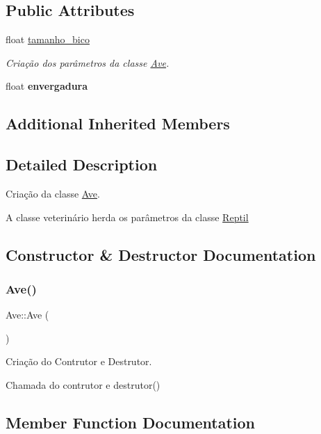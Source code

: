\subsection*{Public Attributes}
\begin{DoxyCompactItemize}
\item 
float \mbox{\hyperlink{class_ave_a0285e182b8a55a290b10b621ed93602d}{tamanho\+\_\+bico}}
\begin{DoxyCompactList}\small\item\em Criação dos parâmetros da classe \mbox{\hyperlink{class_ave}{Ave}}. \end{DoxyCompactList}\item 
\mbox{\label{class_ave_a6736c6a2391314daeb88e3e063c63ac0}} 
float {\bfseries envergadura}
\end{DoxyCompactItemize}
\subsection*{Additional Inherited Members}


\subsection{Detailed Description}
Criação da classe \mbox{\hyperlink{class_ave}{Ave}}. 

A classe veterinário herda os parâmetros da classe \mbox{\hyperlink{class_reptil}{Reptil}} 

\subsection{Constructor \& Destructor Documentation}
\mbox{\label{class_ave_a31bc97c3258df566381300c8b9abc73a}} 
\subsubsection{\texorpdfstring{Ave()}{Ave()}}
{\footnotesize\ttfamily Ave\+::\+Ave (\begin{DoxyParamCaption}{ }\end{DoxyParamCaption})}



Criação do Contrutor e Destrutor. 

Chamada do contrutor e destrutor() 

\subsection{Member Function Documentation}
\mbox{\label{class_ave_a5c3d1e3b7b356a08b2fddd242c2fa426}} 
